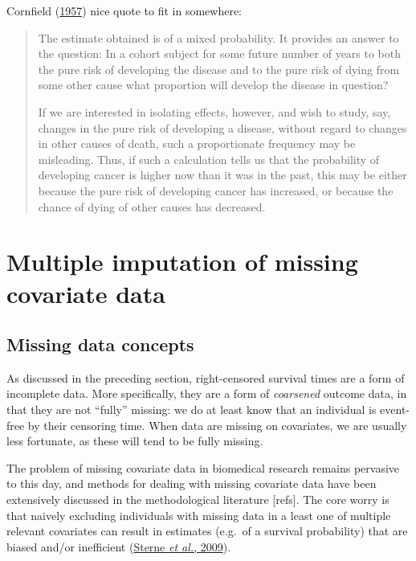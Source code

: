 \documentclass[
  letterpaper,
  DIV=11,
  numbers=noendperiod]{scrreprt}
\begin{document}
Cornfield
(\protect\hyperlink{ref-cornfieldEstimationProbabilityDeveloping1957}{1957})
nice quote to fit in somewhere:

\begin{quote}
The estimate obtained is of a mixed probability. It provides an answer
to the question: In a cohort subject for some future number of years to
both the pure risk of developing the disease and to the pure risk of
dying from some other cause what proportion will develop the disease in
question?

If we are interested in isolating effects, however, and wish to study,
say, changes in the pure risk of developing a disease, without regard to
changes in other causes of death, such a proportionate frequency may be
misleading. Thus, if such a calculation tells us that the probability of
developing cancer is higher now than it was in the past, this may be
either because the pure risk of developing cancer has increased, or
because the chance of dying of other causes has decreased.
\end{quote}

\hypertarget{sec-intro-MI}{%
\section{Multiple imputation of missing covariate
data}\label{sec-intro-MI}}

\hypertarget{missing-data-concepts}{%
\subsection{Missing data concepts}\label{missing-data-concepts}}

As discussed in the preceding section, right-censored survival times are
a form of incomplete data. More specifically, they are a form of
\emph{coarsened} outcome data, in that they are not ``fully'' missing:
we do at least know that an individual is event-free by their censoring
time. When data are missing on covariates, we are usually less
fortunate, as these will tend to be fully missing.

The problem of missing covariate data in biomedical research remains
pervasive to this day, and methods for dealing with missing covariate
data have been extensively discussed in the methodological literature
{[}refs{]}. The core worry is that naively excluding individuals with
missing data in a least one of multiple relevant covariates can result
in estimates (e.g.~of a survival probability) that are biased and/or
inefficient
(\protect\hyperlink{ref-sterneMultipleImputationMissing2009}{Sterne
\emph{et al.}, 2009}).
\end{document}

